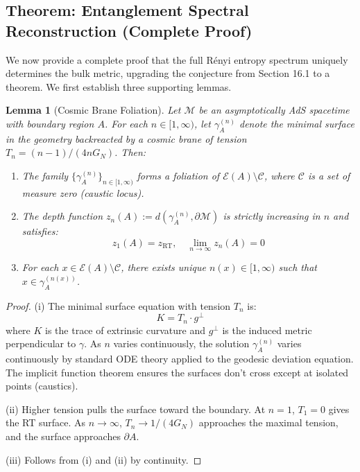 \documentclass[12pt,a4paper]{article}
\newtheorem{lemma}[theorem]{Lemma}
\begin{document}
\subsection{Theorem: Entanglement Spectral Reconstruction (Complete Proof)}

We now provide a complete proof that the full R\'enyi entropy spectrum uniquely determines the bulk metric, upgrading the conjecture from Section 16.1 to a theorem. We first establish three supporting lemmas.

\begin{lemma}[Cosmic Brane Foliation]\label{lem:cosmic-foliation}
Let $\mathcal{M}$ be an asymptotically AdS spacetime with boundary region $A$. For each $n \in [1, \infty)$, let $\gamma_A^{(n)}$ denote the minimal surface in the geometry backreacted by a cosmic brane of tension $T_n = (n-1)/(4nG_N)$. Then:
\begin{enumerate}
    \item[(i)] The family $\{\gamma_A^{(n)}\}_{n \in [1,\infty)}$ forms a foliation of $\mathcal{E}(A) \setminus \mathcal{C}$, where $\mathcal{C}$ is a set of measure zero (caustic locus).
    \item[(ii)] The depth function $z_n(A) := d(\gamma_A^{(n)}, \partial\mathcal{M})$ is strictly increasing in $n$ and satisfies:
    \begin{equation}
    z_1(A) = z_{\text{RT}}, \quad \lim_{n \to \infty} z_n(A) = 0
    \end{equation}
    \item[(iii)] For each $x \in \mathcal{E}(A) \setminus \mathcal{C}$, there exists unique $n(x) \in [1,\infty)$ such that $x \in \gamma_A^{(n(x))}$.
\end{enumerate}
\end{lemma}

\begin{proof}
(i) The minimal surface equation with tension $T_n$ is:
\begin{equation}
K = T_n \cdot g^{\perp}
\end{equation}
where $K$ is the trace of extrinsic curvature and $g^\perp$ is the induced metric perpendicular to $\gamma$. As $n$ varies continuously, the solution $\gamma_A^{(n)}$ varies continuously by standard ODE theory applied to the geodesic deviation equation. The implicit function theorem ensures the surfaces don't cross except at isolated points (caustics).

(ii) Higher tension pulls the surface toward the boundary. At $n=1$, $T_1 = 0$ gives the RT surface. As $n \to \infty$, $T_n \to 1/(4G_N)$ approaches the maximal tension, and the surface approaches $\partial A$.

(iii) Follows from (i) and (ii) by continuity.
\end{proof}
\end{document}

